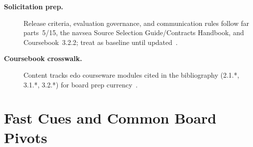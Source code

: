 \documentclass[../main.tex]{subfiles}
\begin{document}
\begin{description}
  \item[\textbf{Solicitation prep.}] Release criteria, evaluation governance, and communication rules follow \ac{far} parts~5/15, the \ac{navsea} Source Selection Guide/Contracts Handbook, and Coursebook~3.2.2; treat as baseline until updated~\autocite{FAR-5-101-Disseminating-Information,FAR-Part-15-Contracting-by-Negotiation,NAVSEA-Source-Selection-Guide-2022,NAVSEA-Contracts-Handbook-2023,edo-3-2-2-solicitation-prep-2025}.
  \item[\textbf{Coursebook crosswalk.}] Content tracks \ac{edo} courseware modules cited in the bibliography (2.1.*, 3.1.*, 3.2.*) for board prep currency~\autocite{edo-2-1-1-command-structures-2025,edo-2-1-5-technical-authority-2025,edo-3-1-1-ppbe-2025,edo-3-1-4-budget-execution-2025,edo-3-2-1-intro-contracting-2025,edo-3-2-2-solicitation-prep-2025}.
\end{description}
\HR

\section{Fast Cues and Common Board Pivots}
\end{document}

